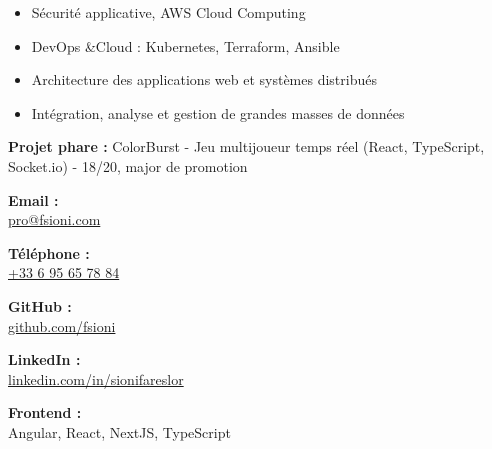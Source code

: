 \documentclass[a4paper,11pt]{article}
\begin{document}
\begin{cv}[profile][2]
\begin{cvevent}[2023][2025]
    \begin{itemize}
        \item Sécurité applicative, AWS Cloud Computing
        \item DevOps \&Cloud : Kubernetes, Terraform, Ansible
        \item Architecture des applications web et systèmes distribués
        \item Intégration, analyse et gestion de grandes masses de données
    \end{itemize}
\end{cvevent}

\begin{cvevent}[2019][2023]
    \textbf{Projet phare :} ColorBurst - Jeu multijoueur temps réel (React, TypeScript, Socket.io) - 18/20, major de promotion
\end{cvevent}

\cvsidebar

\begin{cvitem}[Envelope][4]
    \textbf{Email :}\\
    \href{mailto:pro@fsioni.com}{pro@fsioni.com}
\end{cvitem}

\cvseparator[3]
\begin{cvitem}[Phone][4]
    \textbf{ Téléphone :}\\
    \href{tel:+33695657884}
    {+33 6 95 65 78 84}
\end{cvitem}

\cvseparator[3]
\begin{cvitem}[Github][4]
    \textbf{ GitHub :}\\
    \href{https://github.com/fsioni}{github.com/fsioni}
\end{cvitem}

\cvseparator[3]
\begin{cvitem}[Linkedin][4]
    \textbf{ LinkedIn :}\\
    \href{https://linkedin.com/in/sionifareslor}{linkedin.com/in/sionifareslor}
\end{cvitem}

\begin{cvitem}
    \textbf{ Frontend :} \\
    Angular, React, NextJS, TypeScript
\end{cvitem}


\end{cv}
\end{document}
